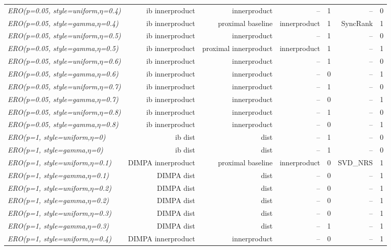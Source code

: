 \documentclass[nohyperref]{article}
\theoremstyle{plain}
\theoremstyle{definition}
\theoremstyle{remark}
\begin{document}
\begin{table*}[!ht]
{\begin{tabular}{lrrrrrr}
			{\it ERO(p=0.05, style=uniform,$\eta$=0.4)} & ib innerproduct & innerproduct & -- & 1 & -- & 0 \\
			{\it ERO(p=0.05, style=gamma,$\eta$=0.4)} & ib innerproduct & proximal baseline & innerproduct & 1 & SyncRank & 1 \\
			{\it ERO(p=0.05, style=uniform,$\eta$=0.5)} & ib innerproduct & innerproduct & -- & 1 & -- & 0 \\
			{\it ERO(p=0.05, style=gamma,$\eta$=0.5)} & ib innerproduct & proximal innerproduct & innerproduct & 1 & -- & 1 \\
			{\it ERO(p=0.05, style=uniform,$\eta$=0.6)} & ib innerproduct & innerproduct & -- & 1 & -- & 0 \\
			{\it ERO(p=0.05, style=gamma,$\eta$=0.6)} & ib innerproduct & innerproduct & -- & 0 & -- & 1 \\
			{\it ERO(p=0.05, style=uniform,$\eta$=0.7)} & ib innerproduct & innerproduct & -- & 1 & -- & 0 \\
			{\it ERO(p=0.05, style=gamma,$\eta$=0.7)} & ib innerproduct & innerproduct & -- & 0 & -- & 1 \\
			{\it ERO(p=0.05, style=uniform,$\eta$=0.8)} & ib innerproduct & innerproduct & -- & 1 & -- & 0 \\
			{\it ERO(p=0.05, style=gamma,$\eta$=0.8)} & ib innerproduct & innerproduct & -- & 0 & -- & 1 \\
			{\it ERO(p=1, style=uniform,$\eta$=0)} & ib dist & dist & -- & 1 & -- & 0 \\
			{\it ERO(p=1, style=gamma,$\eta$=0)} & ib dist & dist & -- & 1 & -- & 0 \\
			{\it ERO(p=1, style=uniform,$\eta$=0.1)} & DIMPA innerproduct & proximal baseline & innerproduct & 0 & SVD\_NRS & 1 \\
			{\it ERO(p=1, style=gamma,$\eta$=0.1)} & DIMPA dist & dist & -- & 0 & -- & 1 \\
			{\it ERO(p=1, style=uniform,$\eta$=0.2)} & DIMPA dist & dist & -- & 0 & -- & 1 \\
			{\it ERO(p=1, style=gamma,$\eta$=0.2)} & DIMPA dist & dist & -- & 0 & -- & 1 \\
			{\it ERO(p=1, style=uniform,$\eta$=0.3)} & DIMPA dist & dist & -- & 0 & -- & 1 \\
			{\it ERO(p=1, style=gamma,$\eta$=0.3)} & DIMPA dist & dist & -- & 1 & -- & 1 \\
			{\it ERO(p=1, style=uniform,$\eta$=0.4)} & DIMPA innerproduct & innerproduct & -- & 0 & -- & 1 \\

\end{tabular}}
\end{table*}
\end{document}
